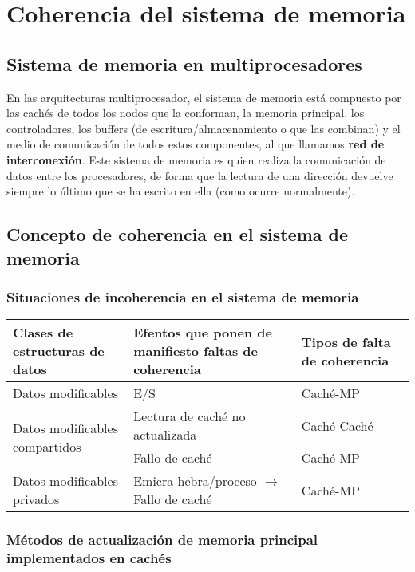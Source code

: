 \section{Coherencia del sistema de memoria}

\subsection{Sistema de memoria en multiprocesadores}

En las arquitecturas multiprocesador, el sistema de memoria está compuesto por las cachés de todos los nodos que la conforman, la memoria principal, los controladores, los buffers (de escritura/almacenamiento o que las combinan) y el medio de comunicación de todos estos componentes, al que llamamos \textbf{red de interconexión}.
Este sistema de memoria es quien realiza la comunicación de datos entre los procesadores, de forma que la lectura de una dirección devuelve siempre lo último que se ha escrito en ella (como ocurre normalmente).

\subsection{Concepto de coherencia en el sistema de memoria}

\subsubsection{Situaciones de incoherencia en el sistema de memoria}

\begin{center}
\begin{tabular}{p{6cm} p{6cm} p{6cm}}
\textbf{Clases de estructuras de datos} & \textbf{Efentos que ponen de manifiesto faltas de coherencia} & \textbf{Tipos de falta de coherencia} \\
\toprule
Datos modificables & E/S & Caché-MP \\
\multirow{2}{*}{Datos modificables compartidos} & Lectura de caché no actualizada & Caché-Caché \\
                                                & Fallo de caché & Caché-MP \\
Datos modificables privados & Emicra hebra/proceso $\rightarrow$ Fallo de caché & Caché-MP \\
\end{tabular}
\end{center}

\subsubsection{Métodos de actualización de memoria principal implementados en cachés}

